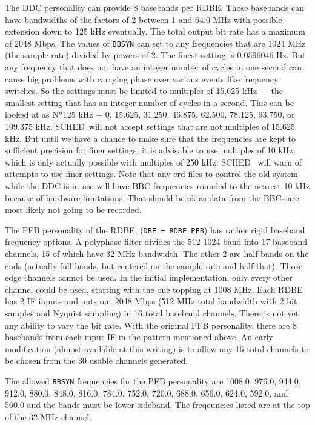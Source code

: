 \documentclass{report}
\newcommand{\schedb}{{\sc SCHED~}}
\begin{document}
The DDC personality can provide 8 basebands per RDBE.  Those basebands
can have bandwidths of the factors of 2 between 1 and 64.0 MHz with
possible extension down to 125 kHz eventually.  The total output bit
rate has a maximum of 2048 Mbps.  The values of {\tt BBSYN} can set to
any frequencies that are 1024 MHz (the sample rate) divided by powers
of 2.  The finest setting is 0.0596046 Hz.  But any frequency that
does not have an integer number of cycles in one second can cause big
problems with carrying phase over various events like frequency
switches.  So the settings must be limited to multiples of 15.625
kHz --- the smallest setting that has an integer number of cycles in a
second.  This can be looked at as N*125 kHz + 0, 15.625, 31.250,
46.875, 62.500, 78.125, 93.750, or 109.375 kHz.  \schedb will not
accept settings that are not multiples of 15.625 kHz.  But until we
have a chance to make sure that the frequencies are kept to sufficient
precision for finer settings, it is advisable to use multiples of 10 
kHz, which is only actually possible with multiples of 250 kHz.  \schedb
will warn of attempts to use finer settings.  Note that any
crd files to control the old system while the DDC is in use will have
BBC frequencies rounded to the nearest 10 kHz because of hardware
limitations.  That should be ok as data from the BBCs are most likely
not going to be recorded.

The PFB personality of the RDBE, ({\tt DBE = RDBE\_PFB}) has rather rigid
baseband frequency options.  A polyphase filter divides the 512-1024
band into 17 baseband channels, 15 of which have 32 MHz bandwidth.
The other 2 are half bands on the ends (actually full bands, but
centered on the sample rate and half that).  Those edge channels
cannot be used.  In the initial implementation, only every other
channel could be used, starting with the one topping at 1008 MHz.
Each RDBE has 2 IF inputs and puts out 2048 Mbps (512 MHz total
bandwidth with 2 bit samples and Nyquist sampling) in 16 total
baseband channels.  There is not yet any ability to vary the bit rate.
With the original PFB personality, there are 8 basebands from each
input IF in the pattern mentioned above.  An early modification
(almost available at this writing) is to allow any 16 total channels
to be chosen from the 30 usable channels generated.

The allowed {\tt BBSYN} frequencies for the PFB personality are
1008.0, 976.0, 944.0, 912.0, 880.0, 848.0, 816.0, 784.0, 752.0, 720.0,
688.0, 656.0, 624.0, 592.0, and 560.0 and the bands must be lower
sideband.  The freqeuncies listed are at the top of the 32 MHz
channel.
\end{document}
